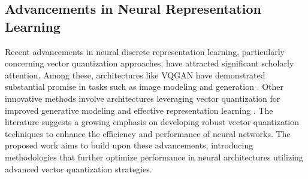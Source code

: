 \subsection{Advancements in Neural Representation Learning}
Recent advancements in neural discrete representation learning, particularly concerning vector quantization approaches, have attracted significant scholarly attention. Among these, architectures like VQGAN have demonstrated substantial promise in tasks such as image modeling and generation \cite{vqgan}. Other innovative methods involve architectures leveraging vector quantization for improved generative modeling \cite{vqvae} and effective representation learning \cite{dall_e}. The literature suggests a growing emphasis on developing robust vector quantization techniques to enhance the efficiency and performance of neural networks. The proposed work aims to build upon these advancements, introducing methodologies that further optimize performance in neural architectures utilizing advanced vector quantization strategies.

